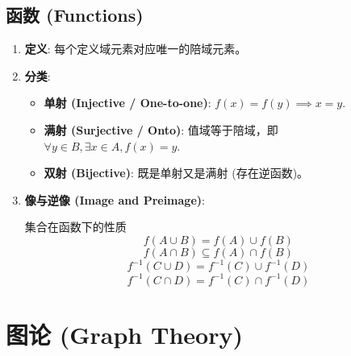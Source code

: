 \documentclass[a4paper,12pt]{ctexart}
\begin{document}
\subsection{函数 (Functions)}

\begin{enumerate}
    \item \textbf{定义}: 每个定义域元素对应唯一的陪域元素。
    \item \textbf{分类}:
    \begin{itemize}
        \item \textbf{单射 (Injective / One-to-one)}: $f(x) = f(y) \implies x = y$.
        \item \textbf{满射 (Surjective / Onto)}: 值域等于陪域，即 $\forall y \in B, \exists x \in A, f(x)=y$.
        \item \textbf{双射 (Bijective)}: 既是单射又是满射 (存在逆函数)。
    \end{itemize}
    \item \textbf{像与逆像 (Image and Preimage)}:
    \begin{myprop}{集合在函数下的性质}{}
        $$f(A \cup B) = f(A) \cup f(B)$$
        $$f(A \cap B) \subseteq f(A) \cap f(B)$$
        $$f^{-1}(C \cup D) = f^{-1}(C) \cup f^{-1}(D)$$
        $$f^{-1}(C \cap D) = f^{-1}(C) \cap f^{-1}(D)$$
    \end{myprop}
\end{enumerate}

\newpage

\section{图论 (Graph Theory)}
\end{document}
